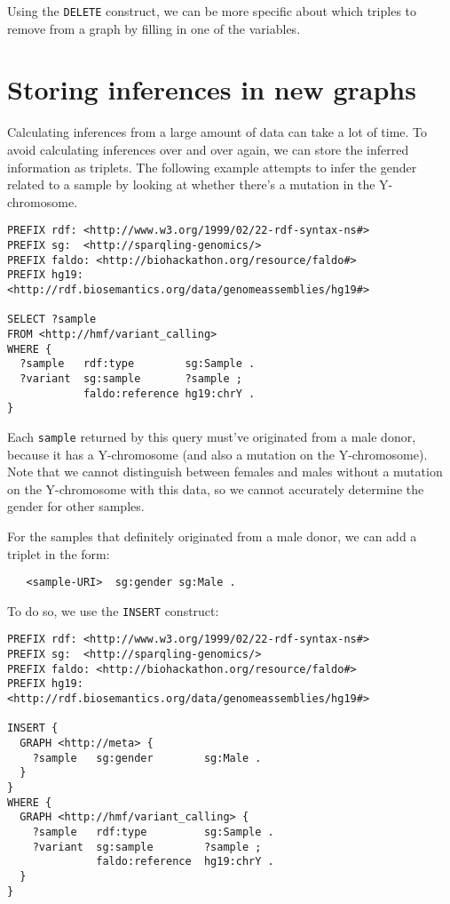   Using the \texttt{DELETE} construct, we can be more specific about which
  triples to remove from a graph by filling in one of the variables.

\section{Storing inferences in new graphs}

  Calculating inferences from a large amount of data can take a lot of time.
  To avoid calculating inferences over and over again, we can store the
  inferred information as triplets.  The following example attempts to infer
  the gender related to a sample by looking at whether there's a mutation in
  the Y-chromosome.

\begin{siderules}
\begin{verbatim}
PREFIX rdf: <http://www.w3.org/1999/02/22-rdf-syntax-ns#>
PREFIX sg:  <http://sparqling-genomics/>
PREFIX faldo: <http://biohackathon.org/resource/faldo#>
PREFIX hg19:  <http://rdf.biosemantics.org/data/genomeassemblies/hg19#>

SELECT ?sample
FROM <http://hmf/variant_calling>
WHERE {
  ?sample   rdf:type        sg:Sample .
  ?variant  sg:sample       ?sample ;
            faldo:reference hg19:chrY .
}
\end{verbatim}
\end{siderules}

 Each \texttt{sample} returned by this query must've originated from a male
 donor, because it has a Y-chromosome (and also a mutation on the
 Y-chromosome).  Note that we cannot distinguish between females and males
 without a mutation on the Y-chromosome with this data, so we cannot accurately
 determine the gender for other samples.

 For the samples that definitely originated from a male donor, we can add a
 triplet in the form:

\begin{siderules}
\begin{verbatim}
   <sample-URI>  sg:gender sg:Male .
\end{verbatim}
\end{siderules}

  To do so, we use the \texttt{INSERT} construct:

\begin{siderules}
\begin{verbatim}
PREFIX rdf: <http://www.w3.org/1999/02/22-rdf-syntax-ns#>
PREFIX sg:  <http://sparqling-genomics/>
PREFIX faldo: <http://biohackathon.org/resource/faldo#>
PREFIX hg19:  <http://rdf.biosemantics.org/data/genomeassemblies/hg19#>

INSERT {
  GRAPH <http://meta> {
    ?sample   sg:gender        sg:Male .
  }
}
WHERE {
  GRAPH <http://hmf/variant_calling> {
    ?sample   rdf:type         sg:Sample .
    ?variant  sg:sample        ?sample ;
              faldo:reference  hg19:chrY .
  }
}
\end{verbatim}
\end{siderules}

